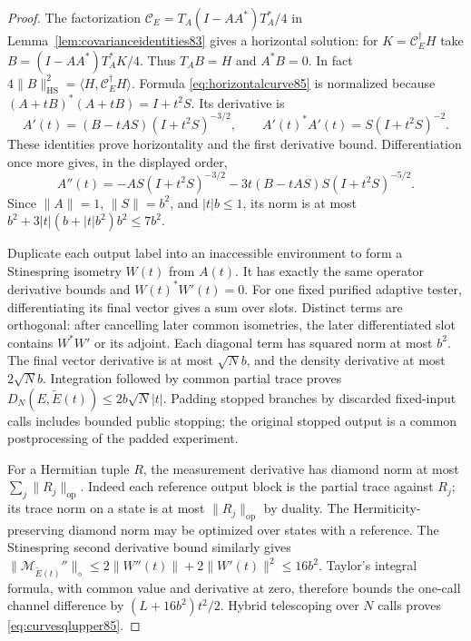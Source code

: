 \begin{proof}
The factorization
$\mathcal C_E=T_A(I-AA^*)T_A^*/4$ in
Lemma~\ref{lem:covarianceidentities83} gives a horizontal solution:
for $K=\mathcal C_E^\dagger H$ take
$B=(I-AA^*)T_A^*K/4$.  Thus $T_AB=H$ and $A^*B=0$.
In fact $4\|B\|_{\mathrm{HS}}^2=
\langle H,\mathcal C_E^\dagger H\rangle$.
Formula \eqref{eq:horizontalcurve85} is normalized because
$(A+tB)^*(A+tB)=I+t^2S$.  Its derivative is
\[
 A'(t)=(B-tAS)(I+t^2S)^{-3/2},\qquad
 A'(t)^*A'(t)=S(I+t^2S)^{-2}.
\]
These identities prove horizontality and the first derivative bound.
Differentiation once more gives, in the displayed order,
\[
 A''(t)=-AS(I+t^2S)^{-3/2}
       -3t(B-tAS)S(I+t^2S)^{-5/2}.
\]
Since $\|A\|=1$, $\|S\|=b^2$, and $|t|b\le1$, its norm is at
most $b^2+3|t|(b+|t|b^2)b^2\le7b^2$.

Duplicate each output label into an inaccessible environment to form
a Stinespring isometry $W(t)$ from $A(t)$.  It has exactly the same
operator derivative bounds and $W(t)^*W'(t)=0$.
For one fixed purified adaptive tester, differentiating its final
vector gives a sum over slots.  Distinct terms are orthogonal: after
cancelling later common isometries, the later differentiated slot
contains $W^*W'$ or its adjoint.  Each diagonal term has squared
norm at most $b^2$.  The final vector derivative is at most
$\sqrt N b$, and the density derivative at most $2\sqrt N b$.
Integration followed by common partial trace proves
$D_N(E,\widetilde E(t))\le2b\sqrt N|t|$.
Padding stopped branches by discarded fixed-input calls includes
bounded public stopping; the original stopped output is a common
postprocessing of the padded experiment.

For a Hermitian tuple $R$, the measurement derivative has diamond norm
at most $\sum_j\|R_j\|_{\mathrm{op}}$.
Indeed each reference output block is the partial trace against $R_j$;
its trace norm on a state is at most $\|R_j\|_{\mathrm{op}}$ by
duality.  The Hermiticity-preserving diamond norm may be optimized
over states with a reference.  The Stinespring second derivative
bound similarly gives
$\|\mathcal M_{\widetilde E(t)}''\|_\diamond
\le2\|W''(t)\|+2\|W'(t)\|^2\le16b^2$.
Taylor's integral formula, with common value and derivative at zero,
therefore bounds the one-call channel difference by
$(L+16b^2)t^2/2$.  Hybrid telescoping over $N$ calls proves
\eqref{eq:curvesqlupper85}.
\end{proof}

